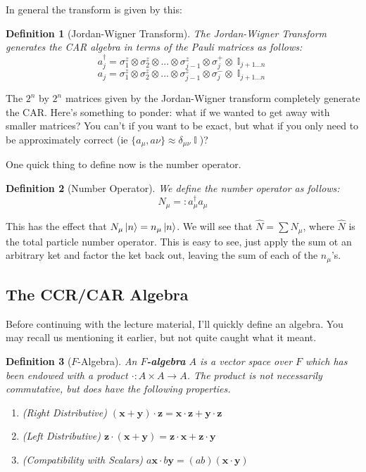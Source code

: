 \documentclass{article}
\DeclareMathOperator{\II}{\mathbb{I}}
\newcommand{\ve}[1]{\mathbf{#1}}
\newtheorem{defn}{Definition}
\begin{document}
In general the transform is given by this:
\begin{defn}[Jordan-Wigner Transform]
The Jordan-Wigner Transform generates the CAR algebra in terms of the Pauli matrices as follows:
\begin{equation}
a_j^\dagger = \sigma_1^z\otimes\sigma_2^z\otimes...\otimes \sigma_{j-1}^z \otimes \sigma_j^+ \otimes \II_{j+1...n}
\end{equation}
\begin{equation}
a_j = \sigma_1^z\otimes\sigma_2^z\otimes...\otimes \sigma_{j-1}^z \otimes \sigma_j^- \otimes \II_{j+1...n}
\end{equation}
\end{defn}

The $2^n$ by $2^n$ matrices given by the Jordan-Wigner transform completely generate the CAR. Here's something to ponder: what if we wanted to get away with smaller matrices? You can't if you want to be exact, but what if you only need to be approximately correct (ie $\{a_\mu,a\nu\} \approx \delta_{\mu \nu}\II$)?

One quick thing to define now is the number operator.
\begin{defn}[Number Operator] We define the number operator as follows:
\begin{equation}N_\mu =: a_\mu^\dagger a_\mu\end{equation}
\end{defn}
This has the effect that $N_\mu\ket{n} = n_\mu\ket{n}$. We will see that $\hat N = \sum N_\mu$, where $\hat N$ is the total particle number operator. This is easy to see, just apply the sum ot an arbitrary ket and factor the ket back out, leaving the sum of each of the $n_\mu$'s.

\subsection{The CCR/CAR Algebra}
Before continuing with the lecture material, I'll quickly define an algebra. You may recall us mentioning it earlier, but not quite caught what it meant.
\begin{defn}[$F$-Algebra]
An \textbf{$F$-algebra} $A$ is a vector space over $F$ which has been endowed with a  product $\cdot : A\times A \to A$. The product is not necessarily commutative, but does have the following properties.
\begin{enumerate}
\item (Right Distributive) $(\ve{x}+\ve{y})\cdot \ve{z} = \ve{x}\cdot \ve{z} + \ve{y}\cdot \ve{z}$
\item (Left Distributive) $\ve{z}\cdot(\ve{x}+\ve{y}) = \ve{z}\cdot \ve{x} + \ve{z} \cdot \ve{y}$
\item (Compatibility with Scalars) $a\ve{x}\cdot b\ve{y} = (ab)(\ve{x}\cdot \ve{y})$
\end{enumerate}
\end{defn}
\end{document}
